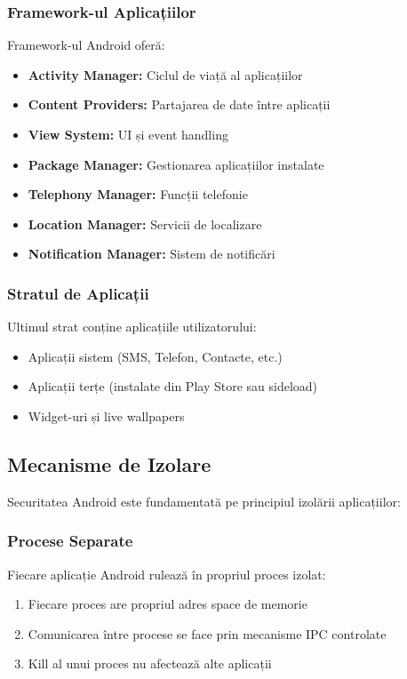\documentclass[11pt,a4paper,twocolumn]{article}
\theoremstyle{definition}
\theoremstyle{plain}
\theoremstyle{remark}
\begin{document}
\subsubsection{Framework-ul Aplicațiilor}
Framework-ul Android oferă:
\begin{itemize}
    \item \textbf{Activity Manager:} Ciclul de viață al aplicațiilor
    \item \textbf{Content Providers:} Partajarea de date între aplicații
    \item \textbf{View System:} UI și event handling
    \item \textbf{Package Manager:} Gestionarea aplicațiilor instalate
    \item \textbf{Telephony Manager:} Funcții telefonie
    \item \textbf{Location Manager:} Servicii de localizare
    \item \textbf{Notification Manager:} Sistem de notificări
\end{itemize}

\subsubsection{Stratul de Aplicații}
Ultimul strat conține aplicațiile utilizatorului:
\begin{itemize}
    \item Aplicații sistem (SMS, Telefon, Contacte, etc.)
    \item Aplicații terțe (instalate din Play Store sau sideload)
    \item Widget-uri și live wallpapers
\end{itemize}

\subsection{Mecanisme de Izolare}

Securitatea Android este fundamentată pe principiul izolării aplicațiilor:

\subsubsection{Procese Separate}
Fiecare aplicație Android rulează în propriul proces izolat:
\begin{enumerate}
    \item Fiecare proces are propriul adres space de memorie
    \item Comunicarea între procese se face prin mecanisme IPC controlate
    \item Kill al unui proces nu afectează alte aplicații
\end{enumerate}
\end{document}
